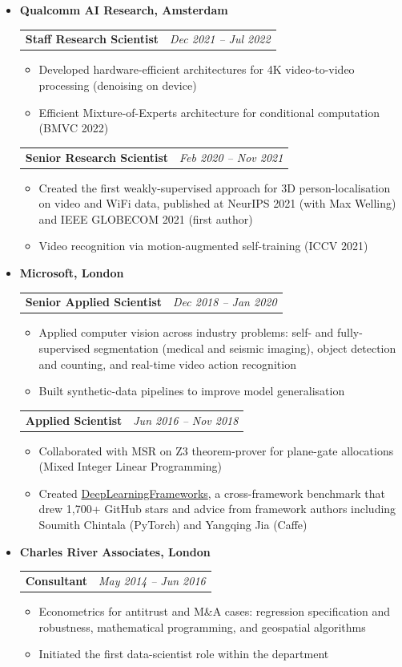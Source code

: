 \documentclass[letterpaper,11pt]{article}
\makeatletter
\newcommand{\cvcompany}[1]{
  \vspace{2pt}\item \textbf{#1} \\[1pt]
}
\newcommand{\cvrole}[2]{
    \begin{tabular*}{0.97\textwidth}[t]{l@{\extracolsep{\fill}}r}
      \textbf{#1} & \textit{\small #2} \\
    \end{tabular*}\vspace{-7pt}
}
\makeatother
\begin{document}
\begin{itemize}[leftmargin=0.15in, label={}]
    \cvcompany{Qualcomm AI Research, Amsterdam}
      \cvrole{Staff Research Scientist}{Dec 2021 -- Jul 2022}
      \begin{itemize}
        \item Developed hardware-efficient architectures for 4K video-to-video processing (denoising on device)
        \item Efficient Mixture-of-Experts architecture for conditional computation (BMVC 2022)
      \end{itemize}
      \cvrole{Senior Research Scientist}{Feb 2020 -- Nov 2021}
      \begin{itemize}
        \item Created the first weakly-supervised approach for 3D person-localisation on video and WiFi data, published at NeurIPS 2021 (with Max Welling) and IEEE GLOBECOM 2021 (first author)
        \item Video recognition via motion-augmented self-training (ICCV 2021)
      \end{itemize}

    \cvcompany{Microsoft, London}
      \cvrole{Senior Applied Scientist}{Dec 2018 -- Jan 2020}
      \begin{itemize}
        \item Applied computer vision across industry problems: self- and fully-supervised segmentation (medical and seismic imaging), object detection and counting, and real-time video action recognition
        \item Built synthetic-data pipelines to improve model generalisation
      \end{itemize}
      \cvrole{Applied Scientist}{Jun 2016 -- Nov 2018}
      \begin{itemize}
        \item Collaborated with MSR on Z3 theorem-prover for plane-gate allocations (Mixed Integer Linear Programming)
        \item Created \href{https://github.com/ilkarman/DeepLearningFrameworks}{DeepLearningFrameworks}, a cross-framework benchmark that drew 1,700+ GitHub stars and advice from framework authors including Soumith Chintala (PyTorch) and Yangqing Jia (Caffe)
      \end{itemize}

    \cvcompany{Charles River Associates, London}
      \cvrole{Consultant}{May 2014 -- Jun 2016}
      \begin{itemize}
        \item Econometrics for antitrust and M\&A cases: regression specification and robustness, mathematical programming, and geospatial algorithms
        \item Initiated the first data-scientist role within the department
      \end{itemize}


\end{itemize}
\end{document}
